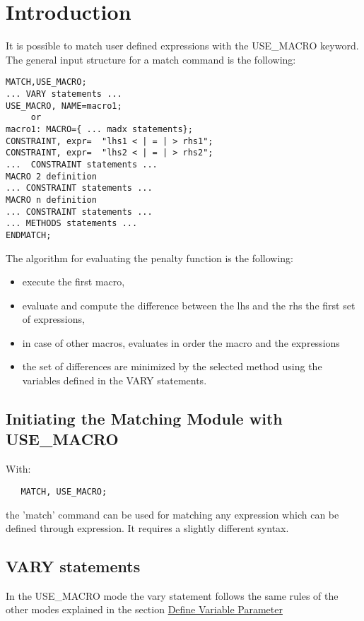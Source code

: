 
\section{ Introduction }
 
It is possible to match user defined expressions with the USE\_MACRO keyword.
The general input structure for a match command is the following:

\begin{verbatim}
MATCH,USE_MACRO;
... VARY statements ...
USE_MACRO, NAME=macro1;
     or
macro1: MACRO={ ... madx statements};
CONSTRAINT, expr=  "lhs1 < | = | > rhs1";
CONSTRAINT, expr=  "lhs2 < | = | > rhs2";
...  CONSTRAINT statements ...
MACRO 2 definition
... CONSTRAINT statements ...
MACRO n definition
... CONSTRAINT statements ...
... METHODS statements ...
ENDMATCH;
\end{verbatim}
 
The algorithm for evaluating the penalty function is the following:
 
\begin{itemize}
   \item  execute the first macro,
   \item  evaluate and compute the difference between the lhs and the
     rhs the first set of expressions, 
   \item in case of other macros, evaluates in order the macro and the
     expressions 
   \item  the set of differences are  minimized by the selected method
     using the variables defined in the VARY statements. 
\end{itemize}

\subsection{Initiating the Matching Module with USE\_MACRO}
 
 With:
\begin{verbatim}
   MATCH, USE_MACRO;
\end{verbatim}
the 'match' command can be used for matching any expression which can be
defined through expression. It requires a slightly different syntax.

\subsection{VARY statements}
In the USE\_MACRO mode the vary statement follows the same rules of the
other modes explained in the section \href{match_vary.html}{Define
  Variable Parameter} 

